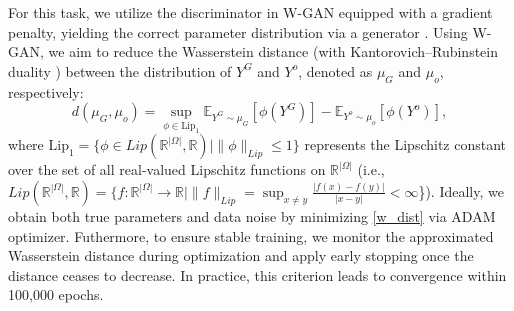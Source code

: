 \documentclass[letterpaper]{article} %
\theoremstyle{thmstyleone}%
\theoremstyle{thmstyletwo}%
\theoremstyle{thmstylethree}%
\begin{document}
For this task, we utilize the discriminator in W-GAN equipped with a gradient penalty, yielding the correct parameter distribution via a generator \citep{arjovsky2017wasserstein, gulrajani2017improved}. Using W-GAN, we aim to reduce the Wasserstein distance (with Kantorovich–Rubinstein duality \citep{villani2009optimal}) between the distribution of $Y^{G}$ and $Y^{o}$, denoted as $\mu_{G}$ and $\mu_{o}$, respectively: 
\begin{equation}\label{w_dist} 
d(\mu_{G}, \mu_{o}) = \sup_{\phi \in \text{Lip}_{1}}\mathbb{E}_{Y^{G} \sim \mu_{G}}[\phi(Y^{G})]-\mathbb{E}_{Y^{o} \sim \mu_{o}}[\phi(Y^{o})],
\end{equation}
where $\text{Lip}_{1} = \{\phi \in Lip(\mathbb{R}^{|\Omega|},\mathbb{R}) | \| \phi\|_{Lip}\leq1\}$ represents the Lipschitz constant over the set of all real-valued Lipschitz functions on $\mathbb{R}^{|\Omega|}$ (i.e., $Lip(\mathbb{R}^{|\Omega|},\mathbb{R})=\{f:\mathbb{R}^{|\Omega|}\rightarrow\mathbb{R} | \|f\|_{Lip}=\sup_{x \neq y } \frac{|f(x)-f(y)|}{|x-y|}<\infty $\}). Ideally, we obtain both true parameters and data noise by minimizing \cref{w_dist} via ADAM optimizer. Futhermore, to ensure stable training, we monitor the approximated Wasserstein distance during optimization and apply early stopping once the distance ceases to decrease. In practice, this criterion leads to convergence within 100,000 epochs. 
\end{document}
